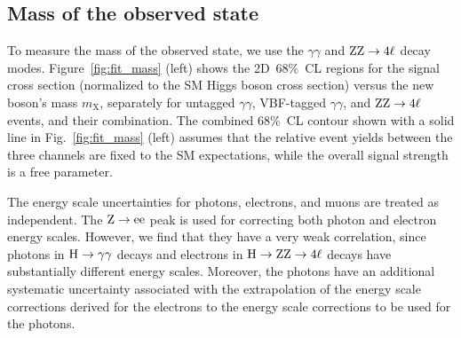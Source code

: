 \documentclass[12pt,twoside,a4paper,cmspaper,final,collab]{cms-tdr}
\begin{document}
\subsection{Mass of the observed state}

To measure the mass of the observed state,
we use the $\gamma\gamma$ and $\mathrm{Z}\mathrm{Z} \to 4\ell$ decay modes.
Figure~\ref{fig:fit_mass} (left) shows
the 2D~68\%~CL regions for
the signal cross section (normalized to the SM Higgs boson cross section) versus the new boson's mass $m_{\mathrm{X}}$, separately for
untagged $\gamma\gamma$, VBF-tagged $\gamma\gamma$, and $\mathrm{Z}\mathrm{Z} \to 4\ell$ events, and their combination.
The combined 68\%~CL contour shown with a solid line in Fig.~\ref{fig:fit_mass} (left)
assumes that the relative event yields between the three channels are fixed to the SM expectations,
while the overall signal strength is a free parameter.

The energy scale uncertainties for photons, electrons, and muons are treated as independent.
The $\mathrm{Z} \to \mathrm{e}\mathrm{e}$ peak is used for correcting both photon and electron energy scales. However,
we find that they have a very weak correlation, since photons in $\mathrm{H} \to \gamma\gamma$
decays and electrons in $\mathrm{H} \to \mathrm{Z}\mathrm{Z} \to 4\ell$ decays have substantially different energy scales.
Moreover, the photons have an additional systematic uncertainty associated with the extrapolation
of the energy scale corrections derived for the electrons to the energy scale corrections
to be used for the photons.
\end{document}
